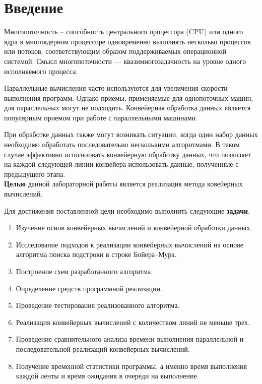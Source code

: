 \chapter*{Введение}

Многопоточность -- способность центрального процессора (CPU) или одного ядра в многоядерном процессоре одновременно выполнять несколько процессов или потоков, соответствующим образом поддерживаемых операционной системой. Смысл многопоточности — квазимногозадачность на уровне одного исполняемого процесса.

Параллельные вычисления часто используются для увеличения скорости выполнения программ. Однако приемы, применяемые для однопоточных машин, для параллельных могут не подходить. Конвейерная обработка данных является популярным приемом при работе с параллельными машинами.

При обработке данных также могут возникать ситуации, когда один набор данных необходимо обработать последовательно несколькими алгоритмами. В таком случае эффективно использовать конвейерную обработку данных, что позволяет на каждой следующей линии конвейера использовать данные, полученные с предыдущего этапа. \\

\textbf{Целью} данной лабораторной работы является реализация метода ковейерных вычислений.

Для достижения поставленной цели необходимо выполнить следующие \textbf{задачи}.

\begin{enumerate}
	\item Изучение основ конвейерных вычислений и конвейерной обработки данных.
	\item Исследование подходов к реализации конвейерных вычислений на основе алгоритма поиска подстроки в строке Бойера--Мура.
	\item Построение схем разработанного алгоритма.
	\item Определение средств программной реализации. 
	\item Проведение тестирования реализованного алгоритма.
	\item Реализация конвейерных вычислений с количеством линий не меньше трех.
	\item Проведение сравнительного анализа времени выполнения параллельной и последовательной реализаций конвейерных вычислений.
	\item Получение временной статистики программы, а именно время выполнения каждой ленты и время ожидания в очереди на выполнение.
\end{enumerate}
\newpage